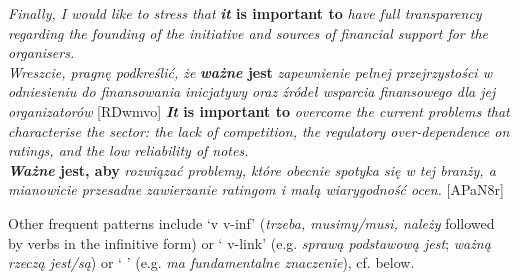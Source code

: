 \documentclass[output=paper]{langscibook}
\begin{document}
\ea
\ea \textit{Finally, I would like to stress that} \textbf{\textit{it} \textbf{is} \textbf{important} \textbf{to}} \textit{have full transparency regarding the founding of the initiative and sources of financial support for the organisers.}\\
\textit{Wreszcie, pragnę podkreślić, że} \textbf{\textit{ważne} \textbf{jest}} \textit{zapewnienie pełnej przejrzystości w odniesieniu do finansowania inicjatywy oraz źródeł wsparcia finansowego dla jej organizatorów} [RDwmvo]
\ex \textbf{\textit{It} \textbf{is} \textbf{important} \textbf{to}} \textit{overcome the current problems that characterise the sector: the lack of competition, the regulatory over-dependence on ratings, and the low reliability of notes.} \\
\textbf{\textit{Ważne} \textbf{jest,} \textbf{aby}} \textit{rozwiązać problemy, które obecnie spotyka się w tej branży, a mianowicie przesadne zawierzanie ratingom i małą wiarygodność ocen.} [APaN8r]
\z
\z

Other frequent patterns include ‘{\MOD}v v-inf’ (\textit{trzeba, musimy/musi, należy} followed by verbs in the infinitive form) or ‘{\NN} {\ADJ} v-link’ (e.g. \textit{sprawą podstawową jest}; \textit{ważną rzeczą jest/są}) or ‘{\glossV} {\ADJ} {\NN}’ (e.g. \textit{ma fundamentalne znaczenie}), cf.  below.
\end{document}
